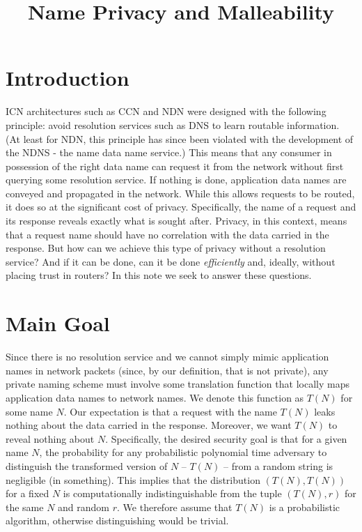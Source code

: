 \documentclass{article}
\begin{document}
\title{Name Privacy and Malleability}

\maketitle

\section{Introduction}
ICN architectures such as CCN and NDN were designed with the following principle:
avoid resolution services such as DNS to learn routable information. (At least
for NDN, this principle has since been violated with the development of the
NDNS - the name data name service.) This means that any consumer in possession
of the right data name can request it from the network without first querying
some resolution service. If nothing is done, application data names are conveyed
and propagated in the network. While this allows requests to be routed, it does so
at the significant cost of privacy. Specifically, the name of a request and its
response reveals exactly what is sought after. Privacy, in this context, means
that a request name should have no correlation with the data carried in the response.
But how can we achieve this type of privacy without a resolution service? And if
it can be done, can it be done \emph{efficiently} and, ideally, without placing
trust in routers? In this note we seek to answer these questions.

\section{Main Goal}
Since there is no resolution service and we cannot simply mimic application names
in network packets (since, by our definition, that is not private), any private
naming scheme must involve some translation function that locally maps application
data names to network names. We denote this function as $T(N)$ for some name $N$.
Our expectation is that a request with the name $T(N)$ leaks nothing about the
data carried in the response. Moreover, we want $T(N)$ to reveal nothing about $N$.
Specifically, the desired security goal is that for a given name $N$, the probability for any
probabilistic polynomial time adversary to distinguish the transformed version
of $N$ -- $T(N)$ -- from a random string is negligible (in something). This implies that
the distribution $(T(N), T(N))$ for a fixed $N$ is computationally indistinguishable
from the tuple $(T(N), r)$ for the same $N$ and random $r$. We therefore assume
that $T(N)$ is a probabilistic algorithm, otherwise distinguishing would be trivial.
\end{document}
